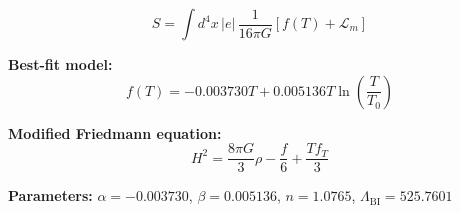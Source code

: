 
\begin{equation}
  S = \int d^4x \, |e| \, \frac{1}{16\pi G} \left[ f(T) + \mathcal{L}_m \right]
\end{equation}

\textbf{Best-fit model:}
\begin{equation}
  f(T) = -0.003730 T + 0.005136 T \ln\!\left(\frac{T}{T_0}\right)
\end{equation}

\textbf{Modified Friedmann equation:}
\begin{equation}
  H^2 = \frac{8\pi G}{3} \rho - \frac{f}{6} + \frac{T f_T}{3}
\end{equation}

\textbf{Parameters:}
$\alpha = -0.003730$, \quad
$\beta = 0.005136$, \quad
$n = 1.0765$, \quad
$\Lambda_{\text{BI}} = 525.7601$